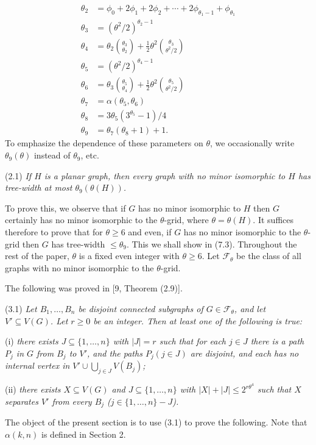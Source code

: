 \begin{align*}
\theta_2 &= \phi_0 + 2\phi_1 + 2\phi_2 + \cdots + 2\phi_{\theta_1 - 1} + \phi_{\theta_1} \\
\theta_3 &= (\theta^2/2)^{\theta_2 - 1} \\
\theta_4 &= \theta_2 \binom{\theta_3}{\theta_2} + \frac{1}{2}\theta^2 \binom{\theta_3}{\theta^2/2} \\
\theta_5 &= (\theta^2/2)^{\theta_4 - 1} \\
\theta_6 &= \theta_3 \binom{\theta_5}{\theta_4} + \frac{1}{2}\theta^2 \binom{\theta_5}{\theta^2/2} \\
\theta_7 &= \alpha(\theta_5, \theta_6) \\
\theta_8 &= 3\theta_5(3^{\theta_5} - 1)/4 \\
\theta_9 &= \theta_7(\theta_8 + 1) + 1.
\end{align*}
To emphasize the dependence of these parameters on $\theta$, we occasionally write $\theta_9(\theta)$ instead of $\theta_9$, etc.

\stmt
(2.1) \textit{If $H$ is a planar graph, then every graph with no minor isomorphic to $H$ has tree-width at most $\theta_9(\theta(H))$.}

To prove this, we observe that if $G$ has no minor isomorphic to $H$ then $G$ certainly has no minor isomorphic to the $\theta$-grid, where $\theta = \theta(H)$. It suffices therefore to prove that for $\theta \ge 6$ and even, if $G$ has no minor isomorphic to the $\theta$-grid then $G$ has tree-width $\le \theta_9$. This we shall show in (7.3). Throughout the rest of the paper, $\theta$ is a fixed even integer with $\theta \ge 6$. Let $\mathscr{F}_\theta$ be the class of all graphs with no minor isomorphic to the $\theta$-grid.


The following was proved in [9, Theorem (2.9)].

\stmt
(3.1) \textit{Let $B_1, \ldots, B_n$ be disjoint connected subgraphs of $G \in \mathscr{F}_\theta$, and let $V' \subseteq V(G)$. Let $r \ge 0$ be an integer. Then at least one of the following is true:}

\hspace*{12pt}(i) \textit{there exists $J \subseteq \{1, \ldots, n\}$ with $|J| = r$ such that for each $j \in J$ there is a path $P_j$ in $G$ from $B_j$ to $V'$, and the paths $P_j (j \in J)$ are disjoint, and each has no internal vertex in $V' \cup \bigcup_{j \in J} V(B_j)$;}

\hspace*{12pt}(ii) \textit{there exists $X \subseteq V(G)$ and $J \subseteq \{1, \ldots, n\}$ with $|X| + |J| \le 2^{r\theta^4}$ such that $X$ separates $V'$ from every $B_j$ ($j \in \{1, \ldots, n\} - J$).}

The object of the present section is to use (3.1) to prove the following. Note that $\alpha(k, n)$ is defined in Section 2.
